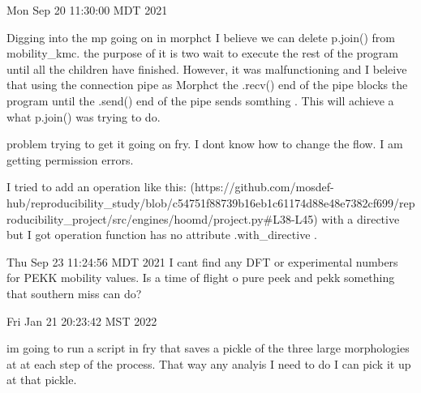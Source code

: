 Mon Sep 20 11:30:00 MDT 2021
    
    Digging into the mp going on in morphct I believe we can delete p.join() from 
    mobility_kmc. the purpose of it is two wait to execute the rest of the program
    until all the children have finished. However, it was malfunctioning and I beleive
    that using the connection pipe as Morphct the .recv() end of the pipe blocks the
    program until the .send() end of the pipe sends somthing . This will achieve 
    a what p.join() was trying to do. 

    problem trying to get it going on fry. I dont know how to change the flow. 
    I am getting permission errors. 

    I tried to add an operation like this: 
    (https://github.com/mosdef-hub/reproducibility_study/blob/c54751f88739b16eb1c61174d88e48e7382cf699/reproducibility_project/src/engines/hoomd/project.py#L38-L45)
    with a directive but I got operation function has no
    attribute .with_directive .
    
Thu Sep 23 11:24:56 MDT 2021
    I cant find any DFT or experimental numbers for PEKK mobility values. Is a time of flight o
    pure peek and pekk something that southern miss can do?
        
Fri Jan 21 20:23:42 MST 2022
    
    im going to run a script in fry that saves a pickle of the three large morphologies at at each step of the 
    process. That way any analyis I need to do I can pick it up at that pickle. 
